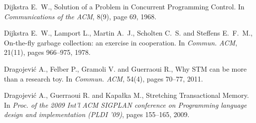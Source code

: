\begin{thebibliography}{99}
{%
% 
% 
% 
% 




Dijkstra E.~W., 
Solution of a Problem in Concurrent Programming Control.
In {\it  Communications of the  ACM}, 8(9), page 69, 1968.

Dijkstra E.~W., Lamport L., Martin A.~J., Scholten C.~S. and 
  Steffens E.~F.~M.,
\newblock On-the-fly garbage collection: an exercise in cooperation.
\newblock In {\em Commun. ACM}, 21(11), pages 966--975, 1978.




Dragojevi\'{c} A., Felber P., Gramoli V. and Guerraoui R.,
\newblock Why {STM} can be more than a research toy.
\newblock In {\em Commun. ACM}, 54(4), pages 70--77, 2011.




Dragojevi\'{c} A., Guerraoui R. and  Kapa\l{}ka M., 
Stretching Transactional Memory. 
In {\it  Proc. of the 2009 Int'l ACM SIGPLAN conference on Programming
 language design and implementation (PLDI '09)},  pages 155--165,  2009. 

}
\end{thebibliography}
